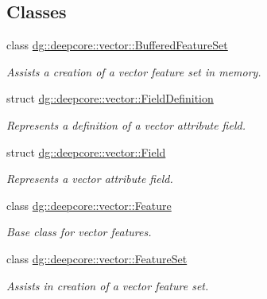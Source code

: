 \subsection*{Classes}
\begin{DoxyCompactItemize}
\item 
class \hyperlink{classdg_1_1deepcore_1_1vector_1_1_buffered_feature_set}{dg\+::deepcore\+::vector\+::\+Buffered\+Feature\+Set}
\begin{DoxyCompactList}\small\item\em Assists a creation of a vector feature set in memory. \end{DoxyCompactList}\item 
struct \hyperlink{structdg_1_1deepcore_1_1vector_1_1_field_definition}{dg\+::deepcore\+::vector\+::\+Field\+Definition}
\begin{DoxyCompactList}\small\item\em Represents a definition of a vector attribute field. \end{DoxyCompactList}\item 
struct \hyperlink{structdg_1_1deepcore_1_1vector_1_1_field}{dg\+::deepcore\+::vector\+::\+Field}
\begin{DoxyCompactList}\small\item\em Represents a vector attribute field. \end{DoxyCompactList}\item 
class \hyperlink{classdg_1_1deepcore_1_1vector_1_1_feature}{dg\+::deepcore\+::vector\+::\+Feature}
\begin{DoxyCompactList}\small\item\em Base class for vector features. \end{DoxyCompactList}\item 
class \hyperlink{classdg_1_1deepcore_1_1vector_1_1_feature_set}{dg\+::deepcore\+::vector\+::\+Feature\+Set}
\begin{DoxyCompactList}\small\item\em Assists in creation of a vector feature set. \end{DoxyCompactList}\end{DoxyCompactItemize}
